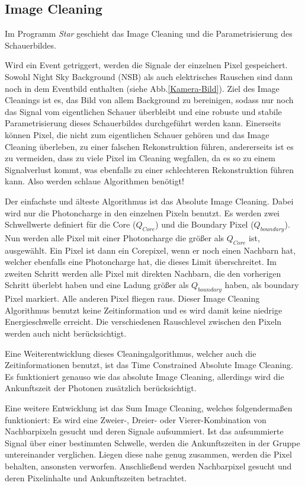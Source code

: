 \subsection{Image Cleaning}
Im Programm \textit{Star} geschieht das Image Cleaning und die Parametrisierung des Schauerbildes.

Wird ein Event getriggert, werden die Signale der einzelnen Pixel gespeichert.
Sowohl Night Sky Background (NSB) als auch elektrisches Rauschen sind dann noch in dem Eventbild enthalten (siehe Abb.\ref{Kamera-Bild}).
Ziel des Image Cleanings ist es, das Bild von allem Background zu bereinigen, sodass nur noch das Signal vom eigentlichen Schauer überbleibt und eine robuste und stabile Parametrisierung dieses Schauerbildes durchgeführt werden kann.
Einerseits können Pixel, die nicht zum eigentlichen Schauer gehören und das Image Cleaning überleben, zu einer falschen Rekonstruktion führen, andererseits ist es zu vermeiden, dass zu viele Pixel im Cleaning wegfallen, da es so zu einem Signalverlust kommt, was ebenfalls zu einer schlechteren Rekonstruktion führen kann.
Also werden schlaue Algorithmen benötigt! 

Der einfachste und älteste Algorithmus ist das Absolute Image Cleaning.
Dabei wird nur die Photoncharge in den einzelnen Pixeln benutzt.
Es werden zwei Schwellwerte definiert für die Core ($Q_{Core}$) und die Boundary Pixel ($Q_{boundary}$).
Nun werden alle Pixel mit einer Photoncharge die größer als $Q_{Core}$ ist, ausgewählt.
Ein Pixel ist dann ein Corepixel, wenn er noch einen Nachbarn hat, welcher ebenfalls eine Photoncharge hat, die dieses Limit überschreitet.
Im zweiten Schritt werden alle Pixel mit direkten Nachbarn, die den vorherigen Schritt überlebt haben und eine Ladung größer als $Q_{boundary}$ haben, als boundary Pixel markiert.
Alle anderen Pixel fliegen raus.
Dieser Image Cleaning Algorithmus benutzt keine Zeitinformation und es wird damit keine niedrige Energieschwelle erreicht. 
Die verschiedenen Rauschlevel zwischen den Pixeln werden auch nicht berücksichtigt.

Eine Weiterentwicklung dieses Cleaningalgorithmus, welcher auch die Zeitinformationen benutzt, ist das Time Constrained Absolute Image Cleaning. 
Es funktioniert genauso wie das absolute Image Cleaning, allerdings wird die Ankunftszeit der Photonen zusätzlich berücksichtigt.

Eine weitere Entwicklung ist das Sum Image Cleaning, welches folgendermaßen funktioniert:
Es wird eine Zweier-, Dreier- oder Vierer-Kombination von Nachbarpixeln gesucht und deren Signale aufsummiert.
Ist das aufsummierte Signal über einer bestimmten Schwelle, werden die Ankunftszeiten in der Gruppe untereinander verglichen. 
Liegen diese nahe genug zusammen, werden die Pixel behalten, ansonsten verworfen.
Anschließend werden Nachbarpixel gesucht und deren Pixelinhalte und Ankunftszeiten betrachtet.

